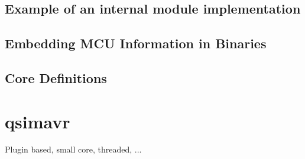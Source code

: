 \subsection{Example of an internal module implementation} %
\subsection{Embedding MCU Information in Binaries}
\subsection{Core Definitions}

\section{qsimavr}

Plugin based, small core, threaded, ...

